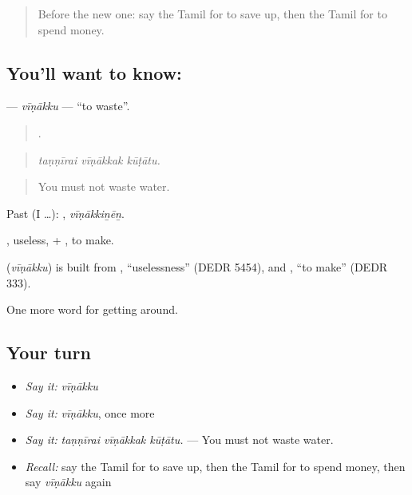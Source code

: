 \label{lesson:TA-C448-vinakku}



\begin{quote}
Before the new one: say the Tamil for to save up, then the Tamil for to spend money.
\end{quote}

\subsection*{You'll want to know: }
\textbf{} — \emph{vīṇākku} — \textquotedblleft{}to waste\textquotedblright{}.

\begin{quote}
  .
\end{quote}

\begin{quote}
\emph{taṇṇīrai vīṇākkak kūṭātu.}
\end{quote}

\begin{quote}
You must not waste water.
\end{quote}

Past (I …): , \emph{vīṇākkiṉēṉ}.

, useless, + , to make.

\begin{cousinweb}
\textbf{} (\emph{vīṇākku}) is built from , \textquotedblleft{}uselessness\textquotedblright{} (DEDR 5454), and , \textquotedblleft{}to make\textquotedblright{} (DEDR 333).
\end{cousinweb}

\begin{grammarlens}[title={What you've built}]
One more word for getting around.
\end{grammarlens}

\subsection*{Your turn}
\begin{itemize}
\raggedright
  \item \emph{Say it:} \emph{vīṇākku}
  \item \emph{Say it:} \emph{vīṇākku}, once more
  \item \emph{Say it:} \emph{taṇṇīrai vīṇākkak kūṭātu.} — You must not waste water.
  \item \emph{Recall:} say the Tamil for to save up, then the Tamil for to spend money, then say \emph{vīṇākku} again
\end{itemize}


